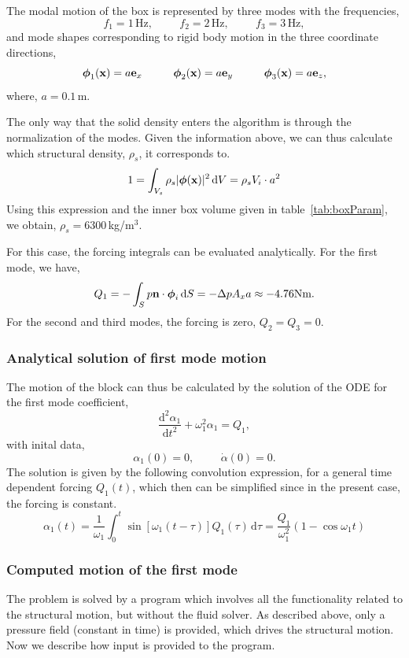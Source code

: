 The modal motion of the box is represented by three modes with the
frequencies,
\[
f_1=1\,\mbox{Hz},\hspace{1cm}
f_2=2\,\mbox{Hz},\hspace{1cm}
f_3=3\,\mbox{Hz},
\]
and mode shapes corresponding to rigid body motion in the three coordinate directions,
\[
\boldsymbol{\phi}_1(\mathbf{x})=a \mathbf{e}_x\hspace{1cm}
\boldsymbol{\phi}_2(\mathbf{x})=a \mathbf{e}_y\hspace{1cm}
\boldsymbol{\phi}_3(\mathbf{x})=a \mathbf{e}_z,
\]
where, $a=0.1\,$m.


The only way that the solid density enters the algorithm is through the normalization
of the modes. Given the information above, we can thus calculate which structural
density, $\rho_s$, it corresponds to.
\[
1=\int_{V_s}\rho_s|\boldsymbol{\phi}(\mathbf{x})|^2\,\mbox{d}V=\rho_s V_i\cdot a^{2}
\]
Using this expression and the inner box volume given in table~\ref{tab:boxParam},
we obtain, $\rho_s=6300\,$kg/m$^3$.

For this case, the forcing integrals can be evaluated analytically. For the first mode,
we have,
\[
Q_1=-\int_S p\mathbf{n}\cdot \boldsymbol{\phi}_i\,\mbox{d}S=-\Delta p A_x a \approx -4.76 \mbox{Nm}.
\]
For the second and third modes, the forcing is zero, $Q_2=Q_3=0$.

\subsubsection{Analytical solution of first mode motion}

The motion of the block can thus be calculated by the solution of the ODE
for the first mode coefficient,
\[
\frac{\mbox{d}^2\alpha_1}{\mbox{d}t^2}+
\omega_1^2\alpha_1=Q_1,
\]
with inital data,
\[
\alpha_1(0)=0, \hspace{1cm} \dot{\alpha}(0)=0.
\]
The solution is given by the following convolution expression, for a general
time dependent forcing $Q_1(t)$, which then can be simplified since in the present case,
the forcing is constant.
\[
\alpha_1(t)=\frac{1}{\omega_1}\int_0^t \sin\left[
\omega_1(t-\tau)
\right] Q_1(\tau)\,\mbox{d}\tau=
\frac{Q_1}{\omega_1^2}(1-\cos \omega_1t)
\]

\subsubsection{Computed motion of the first mode}

The problem is solved by a program which involves all the functionality related to
the structural motion, but without the fluid solver. As described above, only
a pressure field (constant in time) is provided, which drives the structural motion.
Now we describe how input is provided to the program.

